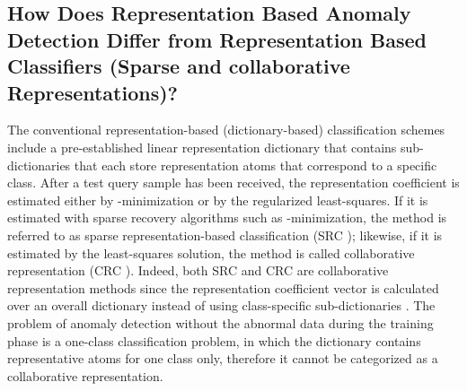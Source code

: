 \documentclass[journal,transmag]{IEEEtran}
\begin{document}
\subsection{How Does Representation Based Anomaly Detection Differ from Representation Based Classifiers (Sparse and collaborative Representations)?}
The conventional representation-based (dictionary-based) classification schemes include a pre-established linear representation dictionary that contains sub-dictionaries that each store representation atoms that correspond to a specific class. 
After a test query sample has been received, the representation coefficient  is estimated either by -minimization or by the regularized least-squares. If it is estimated with sparse recovery algorithms such as -minimization, the method is referred to as sparse representation-based classification (SRC \cite{SRC1} ); likewise, if it is estimated by the least-squares solution, the method is called collaborative representation (CRC \cite{collaborative}). 
Indeed, both SRC and CRC are collaborative representation methods since the representation coefficient vector is calculated over an overall dictionary instead of using class-specific sub-dictionaries \cite{collaborative}. The problem of anomaly detection without the abnormal data during the training phase is a one-class classification problem, in which the dictionary contains representative atoms for one class only, therefore it cannot be categorized as a collaborative representation.
\end{document}

